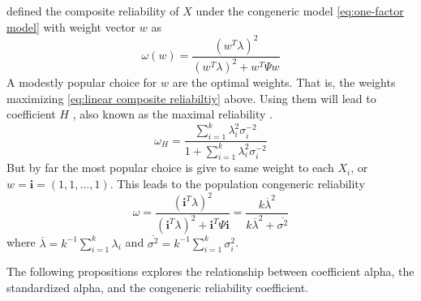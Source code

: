 \documentclass{article}
\theoremstyle{plain}
\theoremstyle{plain}
\theoremstyle{definition}
\theoremstyle{remark}
\theoremstyle{definition}
\theoremstyle{plain}
\theoremstyle{plain}
\theoremstyle{definition}
\begin{document}
\citet[][p. 112]{Joreskog1971-nn} defined the composite reliability of $X$ under the congeneric model \eqref{eq:one-factor model} with weight vector $w$ as 
\begin{equation}
\label{eq:linear composite reliabiltiy}
\omega(w) = \frac{(w^T\lambda)^2}{(w^T\lambda)^2 + w^T \Psi w}
\end{equation}
A modestly popular choice for $w$ are the optimal weights. That is, the weights maximizing \eqref{eq:linear composite reliabiltiy} above. Using them will lead to coefficient $H$ \citep{hancock2001rethinking}, also known as the maximal reliability \citep{Li1997-yh}. 
\begin{equation}
\label{eq:coefficient_H}
\omega_H=\frac{\sum_{i=1}^{k}\lambda_{i}^{2}\sigma_{i}^{-2}}{1+\sum_{i=1}^{k}\lambda_{i}^{2}\sigma_{i}^{-2}}
\end{equation}
But by far the most popular choice is give to same weight to each $X_i$, or $w = \mathbf{i}=\left(1,1,\ldots,1\right)$. This leads to the population congeneric reliability
\begin{equation}
\omega =\frac{(\mathbf{i}^T\lambda)^2}{(\mathbf{i}^T\lambda)^2 + \mathbf{i}^T\Psi\mathbf{i}} =\frac{k\overline{\lambda}^{2}}{k\overline{\lambda}^{2}+\overline{\sigma^{2}}}\label{eq:Congeneric reliability}
\end{equation}
where $\overline{\lambda}=k^{-1}\sum_{i=1}^{k}\lambda_{i}$ and
$\overline{\sigma^{2}}=k^{-1}\sum_{i=1}^{k}\sigma_{i}^{2}$.

The following propositions explores the relationship between coefficient alpha, the standardized alpha, and the congeneric reliability coefficient.
\end{document}
